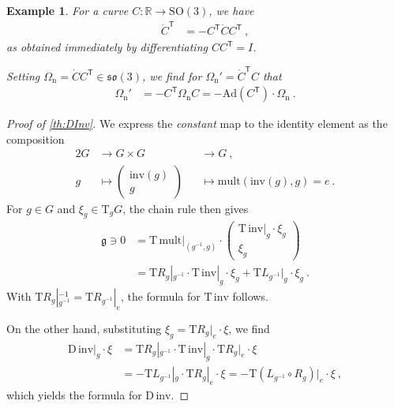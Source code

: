 \documentclass[10pt,a4paper]{article}
\theoremstyle{mytheorem}
\theoremstyle{mydefinition}
\newtheorem{example}[theorem]{Example}
\newcommand{\trans}{^\mathsf{T}}
\newcommand{\Dt}{\mathrm{D}}
\newcommand{\Tt}{\mathrm{T}}
\newcommand{\Ad}{\mathrm{Ad}}
\newcommand{\SO}{\mathrm{SO}}
\newcommand{\fso}{\mathfrak{so}}
\newcommand{\nav}{\mathrm{n}}
\begin{document}
\begin{example}
For a curve $C:\mathbb{R}\rightarrow\SO(3)$, we have
\begin{align*}
	\dot{C}\trans &= -C\trans\dot{C}C\trans
	\ ,
\end{align*}
as obtained immediately by differentiating $CC\trans=I$.

Setting $\Omega_\nav=\dot{C}C\trans\in\fso(3)$, we find for $\Omega_\nav'=\dot{C}\trans C$ that
\begin{align*}
	\Omega_\nav' &= -C\trans\Omega_\nav C = -\Ad(C\trans)\cdot \Omega_\nav
	\ .
\end{align*}
\end{example}

\begin{proof}[Proof of \ref{th:DInv}]
We express the \emph{constant} map to the identity element as the composition
\begin{alignat*}{2}
	G 
	&\rightarrow G\times G 
	&&\rightarrow G
	\ ,\nonumber\\
	g 
	&\mapsto
	\begin{pmatrix}
		\mathrm{inv}(g) \\ g
	\end{pmatrix}
	&&\mapsto \mathrm{mult}(\mathrm{inv}(g), g) = e
	\ .
\end{alignat*}
For $g\in G$ and $\xi_g\in\Tt_gG$, the chain rule then gives
\begin{align*}
	\mathfrak{g}\ni	
	0 &= 
	\Tt\,\mathrm{mult}|_{(g^{-1},g)}
	\cdot
	\begin{pmatrix}
		\Tt\,\mathrm{inv}|_{g} \cdot \xi_g \\
		\xi_g
	\end{pmatrix}
	\nonumber\\
	&= 
	\Tt R_g|_{g^{-1}}\cdot \Tt\,\mathrm{inv}|_{g} \cdot \xi_g
	+ \Tt L_{g^{-1}}|_g\cdot \xi_g
	\ .
\end{align*}
With $\Tt R_g|_{g^{-1}}^{-1}=\Tt R_{g^{-1}}|_{e}$, the formula for $\Tt\,\mathrm{inv}$ follows.

On the other hand, substituting $\xi_g=\Tt R_g|_e\cdot \xi$, we find
\begin{align*}
	\Dt\,\mathrm{inv}|_{g} \cdot \xi
	&= \Tt R_g|_{g^{-1}}
	\cdot \Tt\,\mathrm{inv}|_{g}
	\cdot \Tt R_g|_e\cdot \xi
	\nonumber\\
	&= -\Tt L_{g^{-1}}|_g\cdot \Tt R_g|_e \cdot \xi
	= -\Tt (L_{g^{-1}}\circ R_g)|_e \cdot \xi
	\ ,
\end{align*}
which yields the formula for $\Dt\,\mathrm{inv}$.
\end{proof}
\end{document}
